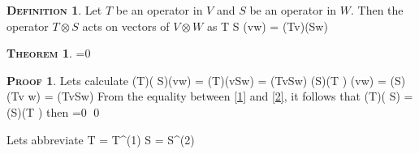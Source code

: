 \documentclass[oneside, 12pt]{book}
\theoremstyle{definition}
\newtheorem{mydef}{\textsc{Definition}}[chapter]
\newtheorem{mytheorem}{\textsc{Theorem}}[chapter]
\newtheorem{myproof}{\textsc{Proof}}[chapter]
\begin{document}
\begin{mydef}
Let \(T\) be an operator in \(V\) and \(S\) be an operator in \(W\). Then the operator \(T\otimes S\) acts on vectors of \(V\otimes W\) as
\beq[] T \otimes S (v\otimes w) = (Tv)\otimes(Sw) \eeq
\end{mydef}

\begin{mytheorem}
\beq[]  =0 \eeq
\end{mytheorem}

\begin{myproof}
Lets calculate
\beq[1] (T\otimes {})\cdot( \otimes S)(v\otimes w) = (T\otimes {})(v\otimes Sw) = (Tv\otimes Sw) \eeq
\beq[2] (\otimes S)\cdot (T \otimes {}) (v\otimes w) = (\otimes S)(Tv \otimes w) = (Tv\otimes Sw) \eeq
From the equality between \eqref{1} and \eqref{2}, it follows that
\beq[] (T\otimes {})\cdot( \otimes S) = (\otimes S)\cdot (T \otimes {})  \eeq
then
\beq[]  =0 \eeq \qed
\end{myproof}

Lets abbreviate
\beq[] T\otimes {} = T^{(1)} \eeq
\beq[]  \otimes S = S^{(2)} \eeq
\end{document}
